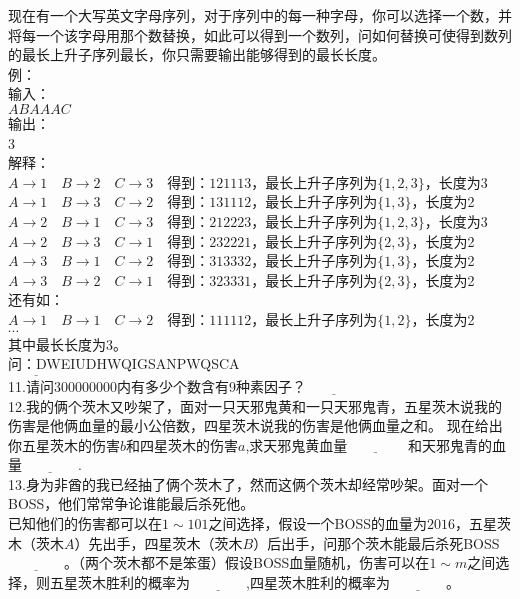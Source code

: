 现在有一个大写英文字母序列，对于序列中的每一种字母，你可以选择一个数，并将每一个该字母用那个数替换，如此可以得到一个数列，问如何替换可使得到数列的最长上升子序列最长，你只需要输出能够得到的最长长度。 \\
例： \\
输入： \\
$ABAAAC$ \\
输出： \\
3 \\
解释： \\
$A\rightarrow 1\quad	B\rightarrow 2\quad	C\rightarrow 3\quad$得到：$121113$，最长上升子序列为$\{1,2,3\}$，长度为3 \\
$A\rightarrow 1\quad	B\rightarrow 3\quad	C\rightarrow 2\quad$得到：$131112$，最长上升子序列为$\{1,3\}$，长度为2 \\
$A\rightarrow 2\quad	B\rightarrow 1\quad	C\rightarrow 3\quad$得到：$212223$，最长上升子序列为$\{1,2,3\}$，长度为3 \\
$A\rightarrow 2\quad	B\rightarrow 3\quad	C\rightarrow 1\quad$得到：$232221$，最长上升子序列为$\{2,3\}$，长度为2 \\
$A\rightarrow 3\quad	B\rightarrow 1\quad	C\rightarrow 2\quad$得到：$313332$，最长上升子序列为$\{1,3\}$，长度为2 \\
$A\rightarrow 3\quad	B\rightarrow 2\quad	C\rightarrow 1\quad$得到：$323331$，最长上升子序列为$\{2,3\}$，长度为2 \\
还有如： \\
$A\rightarrow 1\quad	B\rightarrow 1\quad	C\rightarrow 2\quad$得到：$111112$，最长上升子序列为$\{1,2\}$，长度为2 \\
$\cdots $ \\
其中最长长度为3。 \\

\noindent 问：DWEIUDHWQIGSANPWQSCA \\
$\underline{\qquad \qquad }$ \\

\noindent 11.请问300000000内有多少个数含有9种素因子？$\underline{\qquad \qquad }$ \\

\noindent 12.我的俩个茨木又吵架了，面对一只天邪鬼黄和一只天邪鬼青，五星茨木说我的伤害是他俩血量的最小公倍数，四星茨木说我的伤害是他俩血量之和。 现在给出你五星茨木的伤害$b$和四星茨木的伤害$a$,求天邪鬼黄血量$\underline{\qquad \qquad }$ 和天邪鬼青的血量$\underline{\qquad \qquad }$. \\

\noindent 13.身为非酋的我已经抽了俩个茨木了，然而这俩个茨木却经常吵架。面对一个BOSS，他们常常争论谁能最后杀死他。 \\
已知他们的伤害都可以在$1\sim 101$之间选择，假设一个BOSS的血量为$2016$，五星茨木（茨木$A$）先出手，四星茨木（茨木$B$）后出手，问那个茨木能最后杀死BOSS$\underline{\qquad \qquad }$。（两个茨木都不是笨蛋）假设BOSS血量随机，伤害可以在$1\sim m$之间选择，则五星茨木胜利的概率为$\underline{\qquad \qquad }$,四星茨木胜利的概率为$\underline{\qquad \qquad }$。 \\

